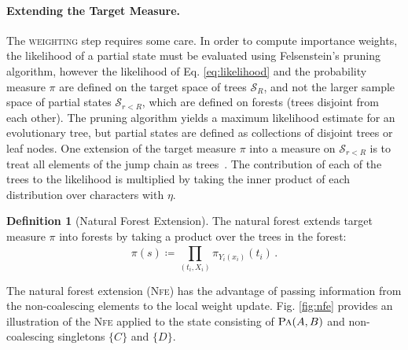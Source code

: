 \documentclass[accepted]{uai2021} %
\theoremstyle{definition}
\newtheorem{definition}{Definition}
\begin{document}
\paragraph{Extending the Target Measure.} The \textsc{weighting} step requires some care. In order to compute importance weights, the likelihood of a partial state must be evaluated using Felsenstein's pruning algorithm, however the likelihood of Eq. \ref{eq:likelihood} and the probability measure $\pi$ are defined on the target space of trees $\mathcal{S}_R$, and not the larger sample space of partial states $ \mathcal{S}_{r<R}$, which are defined on forests (trees disjoint from each other). The pruning algorithm yields a maximum likelihood estimate for an evolutionary tree, but partial states are defined as collections of disjoint trees or leaf nodes. %
One extension of the target measure $\pi$ into a measure on $\mathcal{S}_{r<R}$ is to treat all elements of the jump chain as trees~\citep{csmc}. The contribution of each of the trees to the likelihood is multiplied %
by taking the inner product of each distribution over characters with $\eta$. 
\begin{definition}[Natural Forest Extension]
 The natural forest extends target measure $\pi$ into forests by taking a product over the trees in the forest:
\begin{equation}
    \pi(s) \coloneqq \prod\limits_{(t_i,X_i)}^{}\pi_{Y_i(x_i)}(t_i)\,.
\end{equation}
\end{definition}
The natural forest extension (\textsc{Nfe}) has the advantage of passing information from the non-coalescing elements to the local weight update. Fig. \ref{fig:nfe} provides an illustration of the \textsc{Nfe} applied to the state consisting of  $\textsc{Pa}(A,B)$ and non-coalescing singletons $\{C\}$ and $\{D\}$.
\end{document}
